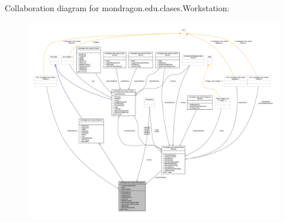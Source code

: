 Collaboration diagram for mondragon.\+edu.\+clases.\+Workstation\+:
\nopagebreak
\begin{figure}[H]
\begin{center}
\leavevmode
\includegraphics[width=350pt]{classmondragon_1_1edu_1_1clases_1_1_workstation__coll__graph}
\end{center}
\end{figure}
